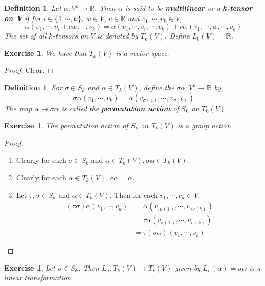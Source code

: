 \documentclass[12pt]{amsart}
\newtheorem{defn}[thm]{Definition}
\newtheorem{ex}[thm]{Exercise}
\newcommand{\al}{\alpha}
\newcommand{\sig}{\sigma}
\newcommand{\R}{\mathbb{R}}
\begin{document}
	\begin{defn}
		Let $\al: V^k \rightarrow \R$. Then $\alpha$ is said to be \textbf{multilinear} or a \textbf{k-tensor on V} if for $i \in \{1, \cdots, k\}$, $w \in V$, $c \in \R$ and $v_1, \cdots, v_k \in V$, $$\al(v_1, \cdots, v_i + cw, \cdots, v_k) = \al(v_1, \cdots, v_i, \cdots, v_k) + c\al(v_1, \cdots, w, \cdots, v_k)$$
		The set of all $k$-tensors on $V$ is denoted by $T_k(V)$. Define $L_0(V) = \R$.
	\end{defn}

	\begin{ex}
		We have that $T_k(V)$ is a vector space. 
	\end{ex}

	\begin{proof}
		Clear.
	\end{proof}

	\begin{defn}
		For $\sig \in S_k$ and $\al \in T_k(V)$, define the $\sig \al : V^k \rightarrow \R$ by $$\sig \al(v_1, \cdots, v_k) = \al(v_{\sig(1)}, \cdots, v_{\sig(k)})$$  The map $\al \mapsto \sig \al$ is called the \textbf{permutation action} of $S_k$ on $T_k(V)$
	\end{defn}

	\begin{ex}
		The permutation action of $S_k$ on $T_k(V)$ is a group action.
	\end{ex}

	\begin{proof} \
		\begin{enumerate}
			\item Clearly for each $\sig \in S_k$ and $\al \in T_k(V), \sig \al \in T_k(V) $.
			\item Clearly for each $\al \in T_k(V)$, $e \al = \al$.
			\item Let $\tau, \sig \in S_k$ and $\al \in T_k(V)$. Then for each $v_1, \cdots, v_k \in V$, 
			\begin{align*}
				(\tau \sig) \al(v_1, \cdots, v_k) 
				&= \al(v_{\tau \sig (1)}, \cdots, v_{\tau \sig (k)}) \\
				&= \tau \al(v_{ \sig (1)}, \cdots, v_{ \sig (k)}) \\ 
				&= \tau (\sig \al) (v_1, \cdots, v_k) 
			\end{align*}
		\end{enumerate}
	\end{proof}

	\begin{ex}
		Let $\sig \in S_k$. Then $L_{\sig}: T_k(V) \rightarrow T_k(V)$ given by $ L_{\sig}(\al) = \sig \al$ is a linear transformation.
	\end{ex}
\end{document}

